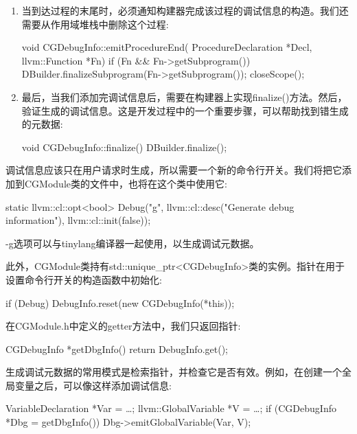 \begin{enumerate}
\item
当到达过程的末尾时，必须通知构建器完成该过程的调试信息的构造。我们还需要从作用域堆栈中删除这个过程:

\begin{cpp}
void CGDebugInfo::emitProcedureEnd(
ProcedureDeclaration *Decl, llvm::Function *Fn) {
    if (Fn && Fn->getSubprogram())
        DBuilder.finalizeSubprogram(Fn->getSubprogram());
    closeScope();
}
\end{cpp}

\item
最后，当我们添加完调试信息后，需要在构建器上实现finalize()方法。然后，验证生成的调试信息。这是开发过程中的一个重要步骤，可以帮助找到错生成的元数据:

\begin{cpp}
void CGDebugInfo::finalize() { DBuilder.finalize(); }
\end{cpp}

\end{enumerate}

调试信息应该只在用户请求时生成，所以需要一个新的命令行开关。我们将把它添加到CGModule类的文件中，也将在这个类中使用它:

\begin{cpp}
static llvm::cl::opt<bool>
    Debug("g", llvm::cl::desc("Generate debug information"),
        llvm::cl::init(false));
\end{cpp}

-g选项可以与tinylang编译器一起使用，以生成调试元数据。

此外，CGModule类持有std::unique\_ptr<CGDebugInfo>类的实例。指针在用于设置命令行开关的构造函数中初始化:

\begin{cpp}
    if (Debug)
        DebugInfo.reset(new CGDebugInfo(*this));
\end{cpp}

在CGModule.h中定义的getter方法中，我们只返回指针:

\begin{cpp}
CGDebugInfo *getDbgInfo() {
    return DebugInfo.get();
}
\end{cpp}

生成调试元数据的常用模式是检索指针，并检查它是否有效。例如，在创建一个全局变量之后，可以像这样添加调试信息:

\begin{cpp}
VariableDeclaration *Var = …;
llvm::GlobalVariable *V = …;
if (CGDebugInfo *Dbg = getDbgInfo())
    Dbg->emitGlobalVariable(Var, V);
\end{cpp}

